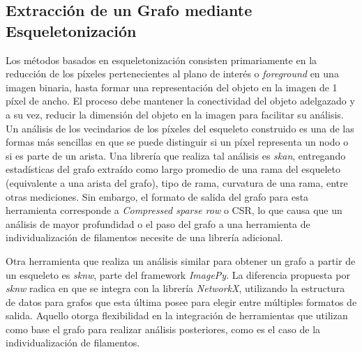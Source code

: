 \subsection{Extracci\'on de un Grafo mediante Esqueletonizaci\'on}
\label{subsec:infoLossSkel}

Los m\'etodos basados en esqueletonizaci\'on consisten primariamente en la reducci\'on de los p\'ixeles pertenecientes al plano de inter\'es o {\it foreground} en una imagen binaria, hasta formar una representaci\'on del objeto en la imagen de 1 p\'ixel de ancho. El proceso debe mantener la conectividad del objeto adelgazado y a su vez, reducir la dimensi\'on del objeto en la imagen para facilitar su an\'alisis\cite{saha2017skeletonization}. Un an\'alisis de los vecindarios de los p\'ixeles del esqueleto construido es una de las formas m\'as sencillas en que se puede distinguir si un p\'ixel representa un nodo o si es parte de un arista. Una librer\'ia que realiza tal an\'alisis es {\it skan}\cite{nunez2018new}, entregando estad\'isticas del grafo extra\'ido como largo promedio de una rama del esqueleto (equivalente a una arista del grafo), tipo de rama, curvatura de una rama, entre otras mediciones. Sin embargo, el formato de salida del grafo para esta herramienta corresponde a {\it Compressed sparse row} o CSR, lo que causa que un an\'alisis de mayor profundidad o el paso del grafo a una herramienta de individualizaci\'on de filamentos necesite de una librer\'ia adicional. 


Otra herramienta que realiza un an\'alisis similar para obtener un grafo a partir de un esqueleto es {\it sknw}, parte del framework {\it ImagePy}\cite{wang2018imagepy}. La diferencia propuesta por {\it sknw} radica en que se integra con la librer\'ia {\it NetworkX}\cite{hagberg2008exploring}, utilizando la estructura de datos para grafos que esta \'ultima posee para elegir entre m\'ultiples formatos de salida. Aquello otorga flexibilidad en la integraci\'on de herramientas que utilizan como base el grafo para realizar an\'alisis posteriores, como es el caso de la individualizaci\'on de filamentos.

